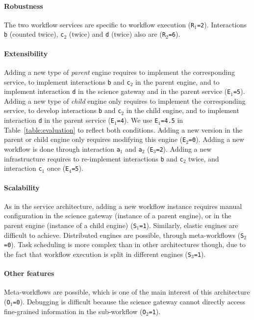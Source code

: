 \documentclass[preprint,3p,twocolumn]{elsarticle}
\begin{document}
\paragraph{Robustness} The two workflow services are specific to
workflow execution (\texttt{R$_1$=2}). Interactions \texttt{b}
(counted twice), \texttt{c$_2$} (twice) and \texttt{d} (twice) also
are (\texttt{R$_2$=6}).

\paragraph{Extensibility} Adding a new type of \emph{parent} engine
requires to implement the corresponding service, to implement
interactions \texttt{b} and \texttt{c$_2$} in the parent engine, and
to implement interaction \texttt{d} in the science gateway and in the
parent service (\texttt{E$_1$=5}). Adding a new type of \emph{child}
engine only requires to implement the corresponding service, to
develop interactions \texttt{b} and \texttt{c$_2$} in the child
engine, and to implement interaction \texttt{d} in the parent service
(\texttt{E$_1$=4}). We use \texttt{E$_1$=4.5} in
Table~\ref{table:evaluation} to reflect both conditions. Adding a new
version in the parent or child engine only requires modifying this
engine (\texttt{E$_2$=0}). Adding a new
workflow is done through interaction \texttt{a$_1$} and \texttt{a$_2$}
(\texttt{E$_3$=2}). Adding a new infrastructure requires to
re-implement interactions \texttt{b} and \texttt{c$_2$} twice, and
interaction \texttt{c$_1$} once (\texttt{E$_4$=5}). 

\paragraph{Scalability} As in the service architecture, adding a new
workflow instance requires manual configuration in the science gateway
(instance of a parent engine), or in the parent engine (instance of a
child engine) (\texttt{S$_1$=1}). Similarly, elastic engines are
difficult to achieve. Distributed engines are
possible, through meta-workflows (\texttt{S$_2$=0}). Task scheduling
is more complex than in other architectures though, due to the fact
that workflow execution is split in different engines (\texttt{S$_3$=1}).

\paragraph{Other features} 
Meta-workflows are possible, which is one of the main interest of this
architecture (\texttt{O$_1$=0}).  Debugging is difficult because the
science gateway cannot directly access fine-grained information in the
sub-workflow (\texttt{O$_2$=1}).
\end{document}
